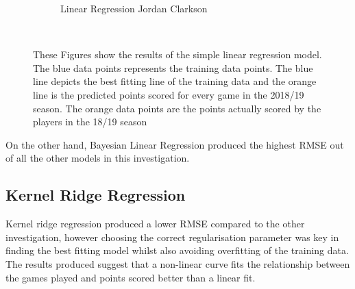 \documentclass[a4paper,11pt,twoside]{article}
\begin{document}
\begin{figure} [h!]
{\begin{subfigure}[b]{.7\textwidth}
\caption{Linear Regression Jordan Clarkson}
\end{subfigure}%
}\\
\caption{These Figures show the results of the simple linear regression model. The blue data points represents the training data points. The blue line depicts the best fitting line of the training data and the orange line is the predicted points scored for every game in the 2018/19 season. The orange data points are the points actually scored by the players in the 18/19 season}
\end{figure}

On the other hand, Bayesian Linear Regression produced the highest RMSE out of all the other models in this investigation.

\subsection{Kernel Ridge Regression}

Kernel ridge regression produced a lower RMSE compared to the other investigation, however choosing the correct regularisation parameter was key in finding the best fitting model whilst also avoiding overfitting of the training data. The results produced suggest that a non-linear curve fits the relationship between the games played and points scored better than a linear fit.
\end{document}
